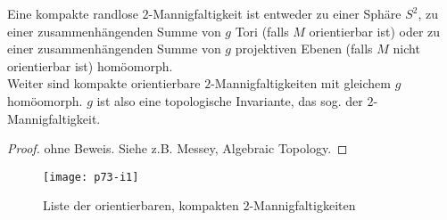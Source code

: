 \begin{theorem}
  Eine kompakte randlose \( 2 \)-Mannigfaltigkeit ist entweder zu einer Sphäre \( S^2 \), zu einer zusammenhängenden Summe von \( g \) Tori (falls \( M \) orientierbar ist) oder zu einer zusammenhängenden Summe von \( g \) projektiven Ebenen (falls \( M \) nicht orientierbar ist) homöomorph. \\
  Weiter sind kompakte orientierbare \( 2 \)-Mannigfaltigkeiten mit gleichem \( g \) homöomorph. \( g \) ist also eine topologische Invariante, das sog. \label{def:geschlecht} der \( 2 \)-Mannigfaltigkeit.
  \begin{proof}
    ohne Beweis. Siehe z.B. Messey, Algebraic Topology.
  \end{proof}
\end{theorem}

\begin{figure}[H]
  \texttt{[image: p73-i1]}
  \caption{Liste der orientierbaren, kompakten \( 2 \)-Mannigfaltigkeiten}
\end{figure}

